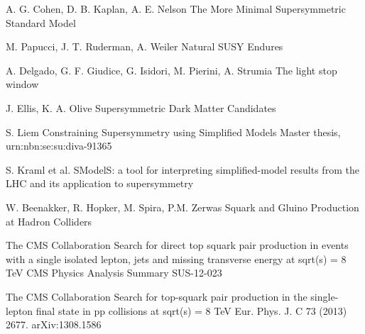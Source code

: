 \begin{thebibliography}{2}
{%



             {A. G. Cohen, D. B. Kaplan, A. E. Nelson}
             {The More Minimal Supersymmetric Standard Model}
             {}}

             {M. Papucci, J. T. Ruderman, A. Weiler}
             {Natural SUSY Endures}
             {}

             {A. Delgado, G. F. Giudice, G. Isidori, M. Pierini, A. Strumia}
             {The light stop window}
             {}

             {J. Ellis, K. A. Olive}
             {Supersymmetric Dark Matter Candidates}
             {}

             {S. Liem}
             {Constraining Supersymmetry using Simplified Models}
             {Master thesis, urn:nbn:se:su:diva-91365}

             {S. Kraml et al.}
             {SModelS: a tool for interpreting simplified-model results from the LHC and its application to supersymmetry}
             {}

             {W. Beenakker, R. Hopker, M. Spira, P.M. Zerwas}
             {Squark and Gluino Production at Hadron Colliders}
             {}


             {The CMS Collaboration}
             {Search for direct top squark pair production in events with a single isolated lepton, jets and missing transverse energy at sqrt(s) = 8 TeV}
             {CMS Physics Analysis Summary SUS-12-023}

             {The CMS Collaboration}
             {Search for top-squark pair production in the single-lepton final state in pp collisions at sqrt(s) = 8 TeV}
             {Eur. Phys. J. C 73 (2013) 2677. arXiv:1308.1586}


\end{thebibliography}
